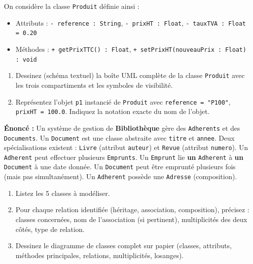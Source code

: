 \documentclass[11pt]{article}
\begin{document}
\begin{exercice}
On considère la classe \texttt{Produit} définie ainsi :
\begin{itemize}
    \item Attributs : \texttt{- reference : String}, \texttt{- prixHT : Float}, \texttt{- tauxTVA : Float = 0.20}
    \item Méthodes : \texttt{+ getPrixTTC() : Float}, \texttt{+ setPrixHT(nouveauPrix : Float) : void}
\end{itemize}
\begin{enumerate}
    \item Dessinez (schéma textuel) la boîte UML complète de la classe \texttt{Produit} avec les trois compartiments et les symboles de visibilité.
    \item Représentez l'objet \texttt{p1} instancié de \texttt{Produit} avec \texttt{reference = "P100"}, \texttt{prixHT = 100.0}. Indiquez la notation exacte du nom de l'objet.
\end{enumerate}
\end{exercice}

\begin{exercice}
\textbf{Énoncé :} Un système de gestion de \textbf{Bibliothèque} gère des \texttt{Adherents} et des \texttt{Documents}. Un \texttt{Document} est une classe abstraite avec \texttt{titre} et \texttt{annee}. Deux spécialisations existent : \texttt{Livre} (attribut \texttt{auteur}) et \texttt{Revue} (attribut \texttt{numero}). Un \texttt{Adherent} peut effectuer plusieurs \texttt{Emprunts}. Un \texttt{Emprunt} lie \textbf{un} \texttt{Adherent} à \textbf{un} \texttt{Document} à une date donnée. Un \texttt{Document} peut être emprunté plusieurs fois (mais pas simultanément). Un \texttt{Adherent} possède une \texttt{Adresse} (composition).
\begin{enumerate}
    \item Listez les 5 classes à modéliser.
    \item Pour chaque relation identifiée (héritage, association, composition), précisez : classes concernées, nom de l'association (si pertinent), multiplicités des deux côtés, type de relation.
    \item Dessinez le diagramme de classes complet sur papier (classes, attributs, méthodes principales, relations, multiplicités, losanges).
\end{enumerate}
\end{exercice}
\end{document}
